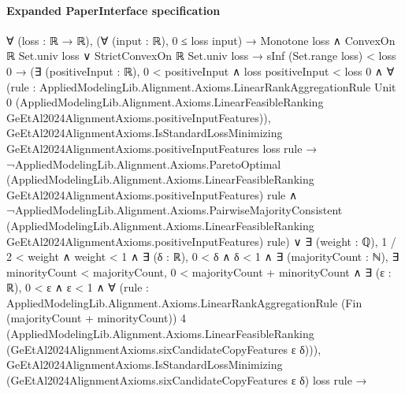 \documentclass[10pt]{article}
\begin{document}
\paragraph{Expanded PaperInterface specification}
\begin{ReviewVerbatim}
∀ (loss : ℝ → ℝ),
  (∀ (input : ℝ), 0 ≤ loss input) →
    Monotone loss ∧ ConvexOn ℝ Set.univ loss ∨ StrictConvexOn ℝ Set.univ loss →
      sInf (Set.range loss) < loss 0 →
        (∃ (positiveInput : ℝ),
            0 < positiveInput ∧
              loss positiveInput < loss 0 ∧
                ∀
                  (rule :
                    AppliedModelingLib.Alignment.Axioms.LinearRankAggregationRule Unit 0
                      (AppliedModelingLib.Alignment.Axioms.LinearFeasibleRanking
                        GeEtAl2024AlignmentAxioms.positiveInputFeatures)),
                  GeEtAl2024AlignmentAxioms.IsStandardLossMinimizing GeEtAl2024AlignmentAxioms.positiveInputFeatures
                      loss rule →
                    ¬AppliedModelingLib.Alignment.Axioms.ParetoOptimal
                          (AppliedModelingLib.Alignment.Axioms.LinearFeasibleRanking
                            GeEtAl2024AlignmentAxioms.positiveInputFeatures)
                          rule ∧
                      ¬AppliedModelingLib.Alignment.Axioms.PairwiseMajorityConsistent
                          (AppliedModelingLib.Alignment.Axioms.LinearFeasibleRanking
                            GeEtAl2024AlignmentAxioms.positiveInputFeatures)
                          rule) ∨
          ∃ (weight : ℚ),
            1 / 2 < weight ∧
              weight < 1 ∧
                ∃ (δ : ℝ),
                  0 < δ ∧
                    δ < 1 ∧
                      ∃ (majorityCount : ℕ),
                        ∃ minorityCount < majorityCount,
                          0 < majorityCount + minorityCount ∧
                            ∃ (ε : ℝ),
                              0 < ε ∧
                                ε < 1 ∧
                                  ∀
                                    (rule :
                                      AppliedModelingLib.Alignment.Axioms.LinearRankAggregationRule
                                        (Fin (majorityCount + minorityCount)) 4
                                        (AppliedModelingLib.Alignment.Axioms.LinearFeasibleRanking
                                          (GeEtAl2024AlignmentAxioms.sixCandidateCopyFeatures ε δ))),
                                    GeEtAl2024AlignmentAxioms.IsStandardLossMinimizing
                                        (GeEtAl2024AlignmentAxioms.sixCandidateCopyFeatures ε δ) loss rule →

\end{ReviewVerbatim}
\end{document}
